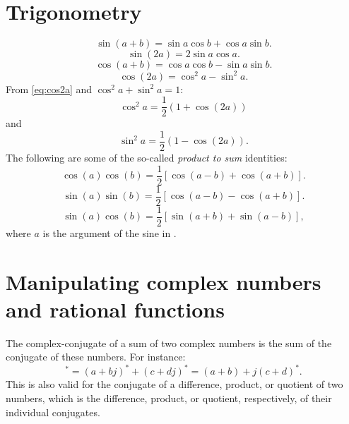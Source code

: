 \section{Trigonometry}
\label{sec:trigonometry}
	\begin{equation}
		\sin(a+b) = \sin a \cos b + \cos a \sin b.
		\label{eq:sinaplusb}
	\end{equation}
	\begin{equation}
		\sin(2a) = 2 \sin a \cos a.
		\label{eq:sin2a}
	\end{equation}
	\begin{equation}
		\cos(a+b) = \cos a \cos b - \sin a \sin b.
		\label{eq:cosaplusb}
	\end{equation}
	\begin{equation}
	\cos(2a) = \cos^2 a - \sin^2 a.
	\label{eq:cos2a}
	\end{equation}
From \ref{eq:cos2a} and $\cos^2 a + \sin^2 a = 1$:
\begin{equation}
 \cos^2 a = \frac{1}{2} (1+\cos (2a))
\label{eq:squaredCosine}
\end{equation}
and
\begin{equation}
 \sin^2 a = \frac{1}{2} (1-\cos (2a)).
\label{eq:squaredSine}
\end{equation}
The following are some of the so-called \emph{product to sum} identities:
	\begin{equation}
		\cos(a)\cos(b) = \frac{1}{2}[\cos (a-b) + \cos(a+b)].
		\label{eq:cosatimescosb}
	\end{equation}
	\begin{equation}
		\sin(a)\sin(b) = \frac{1}{2}[\cos (a-b) - \cos(a+b)].
		\label{eq:sinatimessinb}
	\end{equation}	
	\begin{equation}
		\sin(a)\cos(b) = \frac{1}{2}[\sin (a+b) + \sin(a-b)],
		\label{eq:senatimescosb}
	\end{equation}
where $a$ is the argument of the sine in .

\section{Manipulating complex numbers and rational functions}
\label{sec:complex_conjugate}
The complex-conjugate of a sum of two complex numbers is the sum of the conjugate of these numbers. For instance:
\begin{equation}
[ (a+bj) + (c+dj) ]^* = (a+bj)^* + (c+dj)^* = (a+b) + j(c+d)^*.
\label{eq:sum_complex_numbers}
\end{equation}
This is also valid for the conjugate of a difference, product, or quotient of two numbers, which is the difference, product, or quotient, respectively, of their individual conjugates. 

